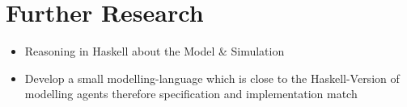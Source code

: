 \section{Further Research}
\begin{itemize}
	\item Reasoning in Haskell about the Model \& Simulation
	\item Develop a small modelling-language which is close to the Haskell-Version of modelling agents therefore specification and implementation match
\end{itemize} 

